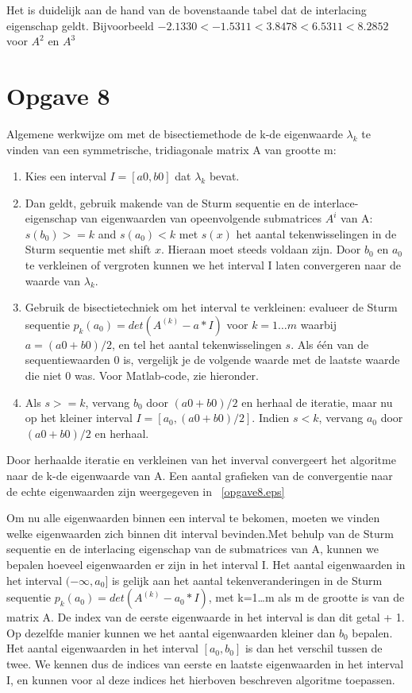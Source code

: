 \documentclass[]{article}
\newcommand{\opgave}[1]{\pagebreak\section*{Opgave #1}}
\begin{document}
Het is duidelijk aan de hand van de bovenstaande tabel dat de interlacing eigenschap geldt. Bijvoorbeeld $-2.1330 < -1.5311 < 3.8478 < 6.5311 < 8.2852$ voor $A^{2}$ en $A^{3}$


\opgave{8}

Algemene werkwijze om met de bisectiemethode de k-de eigenwaarde $\lambda_k$ te vinden van een symmetrische, tridiagonale matrix A van grootte m:

\begin{enumerate}
 \item Kies een interval $I=[a0,b0]$ dat $\lambda_k$ bevat.
 \item Dan geldt, gebruik makende van de Sturm sequentie en de interlace- eigenschap van eigenwaarden van opeenvolgende submatrices $A^{i}$ van A: $s(b_0) >= k$ and $s(a_0) < k$ met $s(x)$ het aantal tekenwisselingen in de Sturm sequentie met shift $x$. Hieraan moet steeds voldaan zijn. Door $b_0$ en $a_0$ te verkleinen of vergroten kunnen we het interval I laten convergeren naar de waarde van $\lambda_k$.
 \item Gebruik de bisectietechniek om het interval te verkleinen: evalueer de Sturm sequentie $p_k(a_0) = det(A^{(k)} - a*I)$ voor $k=1\dots m$ waarbij $a=(a0+b0)/2$, en tel het aantal tekenwisselingen $s$. Als \'{e}\'{e}n van de sequentiewaarden 0 is, vergelijk je de volgende waarde met de laatste waarde die niet 0 was. Voor Matlab-code, zie hieronder.
 \item Als $s >= k$, vervang $b_0$ door $(a0+b0)/2$ en herhaal de iteratie, maar nu op het kleiner interval $I=[a_0,(a0+b0)/2]$.
 Indien $s < k$, vervang $a_0$ door $(a0+b0)/2$ en herhaal.
 \end{enumerate}
 Door herhaalde iteratie en verkleinen van het inverval convergeert het algoritme naar de k-de eigenwaarde van A. Een aantal grafieken van de convergentie naar de echte eigenwaarden zijn weergegeven in ~\ref{opgave8.eps}
 
 Om nu alle eigenwaarden binnen een interval te bekomen, moeten we vinden welke eigenwaarden zich binnen dit interval bevinden.Met behulp van de Sturm sequentie en de interlacing eigenschap van de submatrices van A, kunnen we bepalen hoeveel eigenwaarden er zijn in het interval I. Het aantal eigenwaarden in het interval $ (- \infty, a_0]$ is gelijk aan het aantal tekenveranderingen in de Sturm sequentie $ p_k (a_0) = det (A ^ {(k)} - a_0 * I) $, met k=1\dots m als m de grootte is van de matrix A. De index van de eerste eigenwaarde in het interval is dan dit getal + 1. Op dezelfde manier kunnen we het aantal eigenwaarden kleiner dan $ b_0 $ bepalen. Het aantal eigenwaarden in het interval $ [a_0, b_0] $ is dan het verschil tussen de twee. We kennen dus de indices van eerste en laatste eigenwaarden in het interval I, en kunnen voor al deze indices het hierboven beschreven algoritme toepassen.
\end{document}
